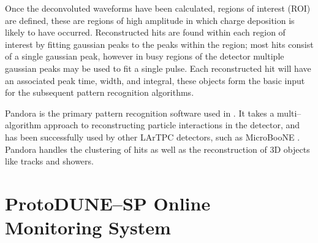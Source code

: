 Once the deconvoluted waveforms have been calculated, regions of interest (ROI) 
are defined, these are regions of high amplitude in which charge deposition is
likely to have occurred. Reconstructed hits are found within each region of
interest by fitting gaussian peaks to the peaks within the region; most hits
consist of a single gaussian peak, however in busy regions of the detector
multiple gaussian peaks may be used to fit a single pulse. Each reconstructed
hit will have an associated peak time, width, and integral, these objects form
the basic input for the subsequent pattern recognition algorithms.


Pandora \cite{Marshall2015} is the primary pattern recognition software used in
\protodune{}. It takes a multi--algorithm approach to reconstructing particle
interactions in the detector, and has been successfully used by other LArTPC
detectors, such as MicroBooNE \cite{Acciarri:2017hat}. Pandora handles the 
clustering of hits as well as the reconstruction of 3D objects like tracks and 
showers. 


\section{ProtoDUNE--SP Online Monitoring System} \label{sec:pdsp_om}
